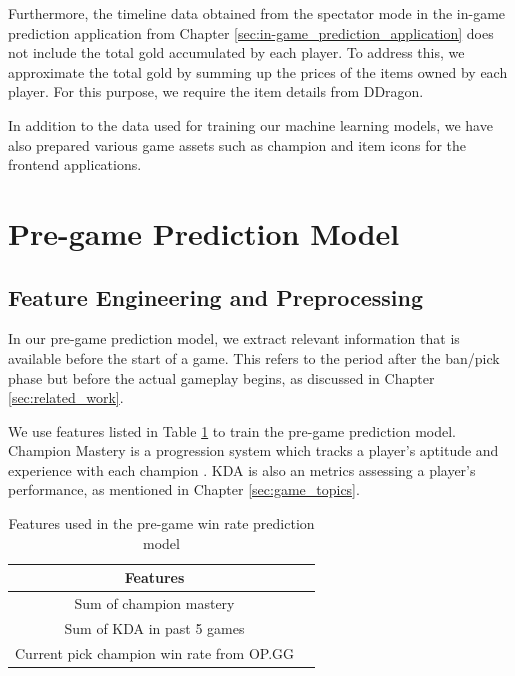 \documentclass[11pt,a4paper,oneside]{report}
\begin{document}
Furthermore, the timeline data obtained from the spectator mode in the in-game prediction application from Chapter \ref{sec:in-game_prediction_application} does not include the total gold accumulated by each player. To address this, we approximate the total gold by summing up the prices of the items owned by each player. For this purpose, we require the item details from DDragon.

In addition to the data used for training our machine learning models, we have also prepared various game assets such as champion and item icons for the frontend applications.

\section{Pre-game Prediction Model}
\label{sec:pre-game_prediction_model}

\subsection{Feature Engineering and Preprocessing}

In our pre-game prediction model, we extract relevant information that is available before the start of a game. This refers to the period after the ban/pick phase but before the actual gameplay begins, as discussed in Chapter \ref{sec:related_work}.

We use features listed in Table \ref{tab:pre_game_features} to train the pre-game prediction model. Champion Mastery is a progression system which tracks a player's aptitude and experience with each champion \cite{lol-wiki-champ-mastery}. KDA is also an metrics assessing a player's performance, as mentioned in Chapter \ref{sec:game_topics}.

\begin{table}[htbp]
  \centering
  \caption{Features used in the pre-game win rate prediction model}
  \label{tab:pre_game_features}
  \begin{tabular}{cc}
    \hline
    \textbf{Features}                         \\
    \hline
    Sum of champion mastery                   \\
    Sum of KDA in past 5 games                \\
    Current pick champion win rate from OP.GG \\
  \end{tabular}
\end{table}
\end{document}
